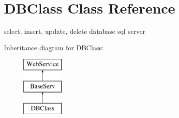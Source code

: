 \hypertarget{class_d_b_class}{\section{D\-B\-Class Class Reference}
\label{class_d_b_class}
}


select, insert, update, delete database sql server  


Inheritance diagram for D\-B\-Class\-:\begin{figure}[H]
\begin{center}
\leavevmode
\includegraphics[height=3.000000cm]{class_d_b_class}
\end{center}
\end{figure}
